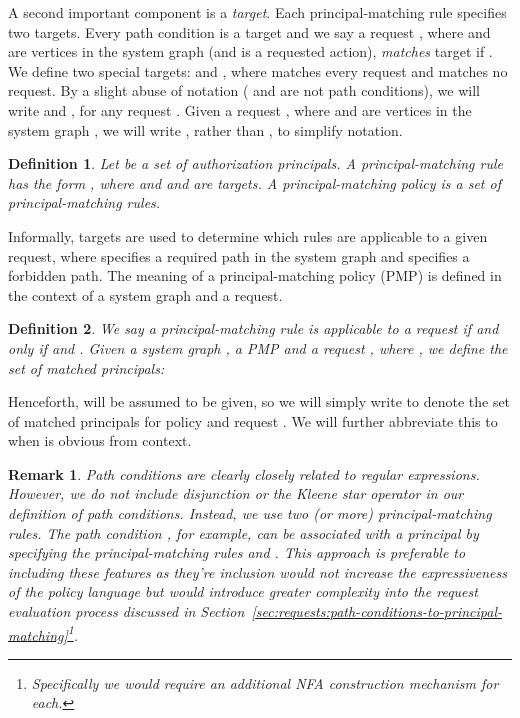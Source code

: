 \documentclass{article}
\newtheorem{definition}{Definition}
\newtheorem{remark}{Remark}
\begin{document}
A second important component is a \emph{target}.
Each principal-matching rule specifies two targets.
Every path condition  is a target and we say a request , where  and  are vertices in the system graph  (and  is a requested action), \emph{matches} target  if .
We define two special targets:  and , where  matches every request and  matches no request.
By a slight abuse of notation ( and  are not path conditions), we will write  and , for any request .
Given a request , where  and  are vertices in the system graph , we will write , rather than , to simplify notation.

\begin{definition}
    Let  be a set of authorization principals.
    A \emph{principal-matching rule} has the form , where  and  and  are targets.
    A \emph{principal-matching policy} is a set of principal-matching rules.
\end{definition}

Informally, targets are used to determine which rules are applicable to a given request, where  specifies a required path in the system graph and  specifies a forbidden path.
The meaning of a principal-matching policy (PMP) is defined in the context of a system graph and a request.

\begin{definition}\label{def:matched-principals}
    We say a principal-matching rule  is \emph{applicable} to a request  if and only if  and .
    Given a system graph , a PMP 
    and a request , where , we define the set of \emph{matched principals}:
    
\end{definition}

Henceforth,  will be assumed to be given, so we will simply write  to denote the set of matched principals for policy  and request .
We will further abbreviate this to  when  is obvious from context.

\begin{remark}
 Path conditions are clearly closely related to regular expressions.
 However, we do not include disjunction or the Kleene star operator in our definition of path conditions.
 Instead, we use two (or more) principal-matching rules.
 The path condition , for example, can be associated with a principal  by specifying the principal-matching rules  and .
 This approach is preferable to including these features as they're inclusion would not increase the expressiveness of the policy language but would introduce greater complexity into the request evaluation process discussed in Section~\ref{sec:requests:path-conditions-to-principal-matching}\footnote{Specifically we would require an additional NFA construction mechanism for each.}.
\end{remark}
\end{document}

